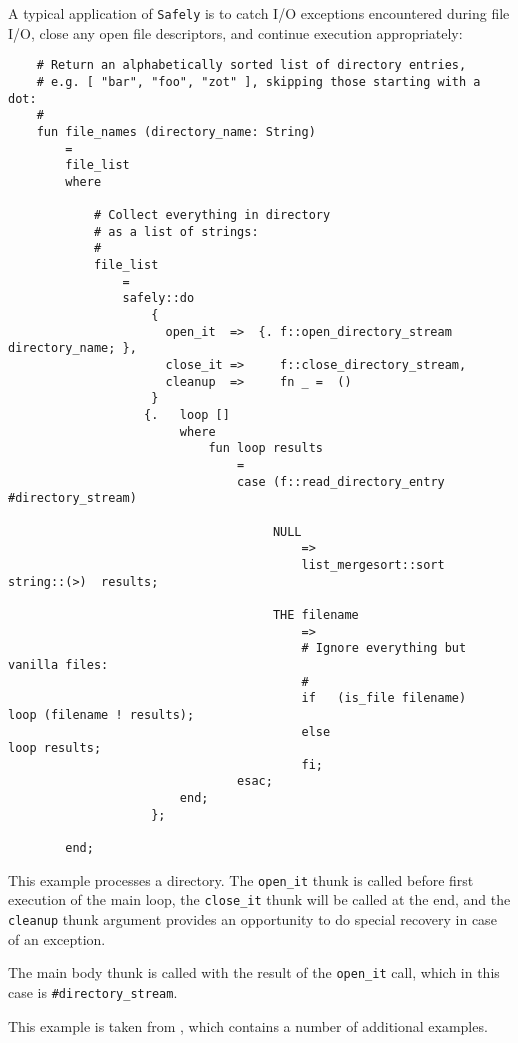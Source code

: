 
A typical application of {\tt Safely} is to catch {\sc I/O} exceptions encountered 
during file {\sc I/O}, close any open file descriptors, and continue execution 
appropriately:

\begin{verbatim}
    # Return an alphabetically sorted list of directory entries,
    # e.g. [ "bar", "foo", "zot" ], skipping those starting with a dot:
    #
    fun file_names (directory_name: String)
        =
        file_list
        where

            # Collect everything in directory
            # as a list of strings:
            #
            file_list
                =
                safely::do
                    {
                      open_it  =>  {. f::open_directory_stream  directory_name; },
                      close_it =>     f::close_directory_stream,
                      cleanup  =>     fn _ =  ()
                    }
                   {.   loop []
                        where
                            fun loop results
                                =
                                case (f::read_directory_entry  #directory_stream)
                                  
                                     NULL
                                         =>
                                         list_mergesort::sort  string::(>)  results;

                                     THE filename
                                         =>
                                         # Ignore everything but vanilla files:
                                         #
                                         if   (is_file filename)   loop (filename ! results);
                                         else                      loop results;
                                         fi;
                                esac;
                        end;
                    };

        end;
\end{verbatim}

This example processes a directory.  The {\tt open\_it} thunk is called before first execution 
of the main loop, the {\tt close\_it} thunk will be called at the end, and the {\tt cleanup} 
thunk argument provides an opportunity to do special recovery in case of an exception.

The main body thunk is called with the result of the {\tt open\_it} call, which in this case 
is {\tt #directory\_stream}.

This example is taken from , which 
contains a number of additional examples.


